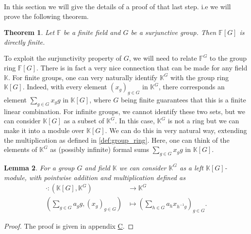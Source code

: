 \documentclass[titlepage, a4paper]{article}
\newcommand{\F}{\mathbb{F}}
\newtheorem{theorem}{Theorem}[section]
\newtheorem{lemma}[theorem]{Lemma}
\theoremstyle{definition}
\theoremstyle{remark}
\newtheorem{remark}[theorem]{Remark}
\begin{document}
	In this section we will give the details of a proof of that last step. 
	i.e we will prove the following theorem. 
	\begin{theorem}\label{thm:gottschalk_kaplansky}
		Let $\F$ be a finite field and $G$ be a surjunctive group. Then $\F[G]$ is directly finite. 
	\end{theorem}
	To exploit the surjunctivity property of $G$, we will need to relate $\mathbb F^G$ to the group ring $\mathbb F[G]$. There is in fact a very nice connection that can be made for any field $\mathbb K$.
	For finite groups, one can very naturally identify $\mathbb K^G$ with the group ring $\mathbb K[G]$. Indeed, with every element $(x_g)_{g \in G}$ in $\mathbb K^G$, there corresponds an element $\sum_{g \in G} x_g g$ in $\mathbb K[G]$, where $G$ being finite guarantees that this is a finite linear combination. For infinite groups, we cannot identify these two sets, but we can consider $\mathbb{K}[G]$ as a subset of $\mathbb K^G$. In this case, $\mathbb K^G$ is not a ring but we can make it into a module over $\mathbb K[G]$. We can do this in very natural way, extending the multiplication as defined in \cref{def:group_ring}. Here, one can think of the elements of $\mathbb K^G$ as (possibly infinite) formal sums $\sum_{g \in G} x_g g$ in $\mathbb K[G]$.

	\begin{lemma}
		For a group $G$ and field $\mathbb K$ we can consider $\mathbb{K}^{G}$ as a left $\mathbb{K}[G]$-module, with pointwise addition and multiplication defined as
		\begin{align*}
			\cdot : (\mathbb{K}[G] , \mathbb{K}^{G}) &\longrightarrow \mathbb{K}^{G} \\
		\left( \sum_{g \in G} a_g g,  (x_g)_{g \in G}\right)  &\longmapsto \left( \sum_{h \in G} a_h x_{h^{-1}g} \right)_{g \in G}
	.\end{align*} 
	\end{lemma}
	\begin{proof}
		The proof is given in appendix \hyperlink{sec:module}{C}.
	\end{proof}
    
\end{document}
